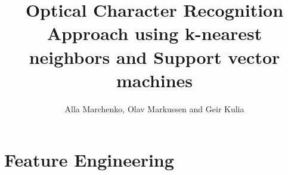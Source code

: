 \documentclass{article}
\begin{document}
\title{\huge Optical Character Recognition \\ \small{Approach using k-nearest neighbors and Support vector machines}}

\author{Alla Marchenko, Olav Markussen and Geir Kulia}

\maketitle

\section{Feature Engineering}
	\label{sec:fe}
	



{}

\end{document}
